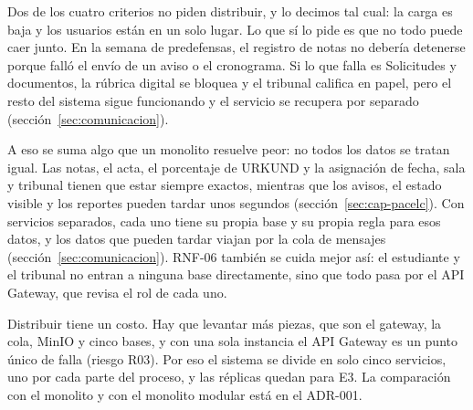 Dos de los cuatro criterios no piden distribuir, y lo decimos tal cual: la carga es baja y los usuarios están en un solo lugar. Lo que sí lo pide es que no todo puede caer junto. En la semana de predefensas, el registro de notas no debería detenerse porque falló el envío de un aviso o el cronograma. Si lo que falla es Solicitudes y documentos, la rúbrica digital se bloquea y el tribunal califica en papel, pero el resto del sistema sigue funcionando y el servicio se recupera por separado (sección~\ref{sec:comunicacion}).

A eso se suma algo que un monolito resuelve peor: no todos los datos se tratan igual. Las notas, el acta, el porcentaje de URKUND y la asignación de fecha, sala y tribunal tienen que estar siempre exactos, mientras que los avisos, el estado visible y los reportes pueden tardar unos segundos (sección~\ref{sec:cap-pacelc}). Con servicios separados, cada uno tiene su propia base y su propia regla para esos datos, y los datos que pueden tardar viajan por la cola de mensajes (sección~\ref{sec:comunicacion}). RNF-06 también se cuida mejor así: el estudiante y el tribunal no entran a ninguna base directamente, sino que todo pasa por el API Gateway, que revisa el rol de cada uno.

Distribuir tiene un costo. Hay que levantar más piezas, que son el gateway, la cola, MinIO y cinco bases, y con una sola instancia el API Gateway es un punto único de falla (riesgo R03). Por eso el sistema se divide en solo cinco servicios, uno por cada parte del proceso, y las réplicas quedan para E3. La comparación con el monolito y con el monolito modular está en el ADR-001.
